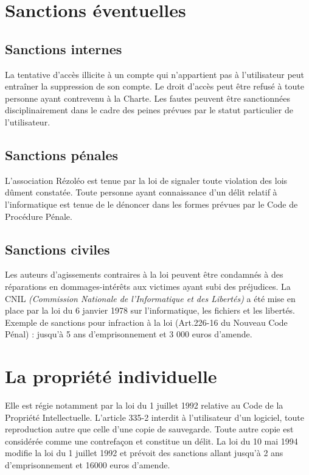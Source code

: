 \documentclass[10pt,a4paper]{article}
\begin{document}
\section{Sanctions éventuelles}
\subsection{Sanctions internes}
La tentative d'accès illicite à un compte qui n'appartient pas à l'utilisateur peut entraîner la suppression de son compte. Le droit d'accès peut être refusé à toute personne ayant contrevenu à la Charte. Les fautes peuvent être sanctionnées disciplinairement dans le cadre des peines prévues par le statut particulier de l'utilisateur.

\subsection{Sanctions pénales}
L'association Rézoléo est tenue par la loi de signaler toute violation des lois dûment constatée. Toute personne ayant connaissance d'un délit relatif à l'informatique est tenue de le dénoncer dans les formes prévues par le Code de Procédure Pénale.

\subsection{Sanctions civiles}
Les auteurs d'agissements contraires à la loi peuvent être condamnés à des réparations en dommages-intérêts aux victimes ayant subi des préjudices. La CNIL \textit{(Commission Nationale de l'Informatique et des Libertés)} a été mise en place par la loi du 6 janvier 1978 sur l'informatique, les fichiers et les libertés. Exemple de sanctions pour infraction à la loi (Art.226-16 du Nouveau Code Pénal) : jusqu'à 5 ans d'emprisonnement et 3 000 euros d'amende.


\section{La propriété individuelle}
Elle est régie notamment par la loi du 1 juillet 1992 relative au Code de la Propriété Intellectuelle. L'article 335-2 interdit à l'utilisateur d'un logiciel, toute reproduction autre que celle d'une copie de sauvegarde. Toute autre copie est considérée comme une contrefaçon et constitue un délit. La loi du 10 mai 1994 modifie la loi du 1 juillet 1992 et prévoit des sanctions allant jusqu'à 2 ans d'emprisonnement et 16000 euros d'amende.
\end{document}
